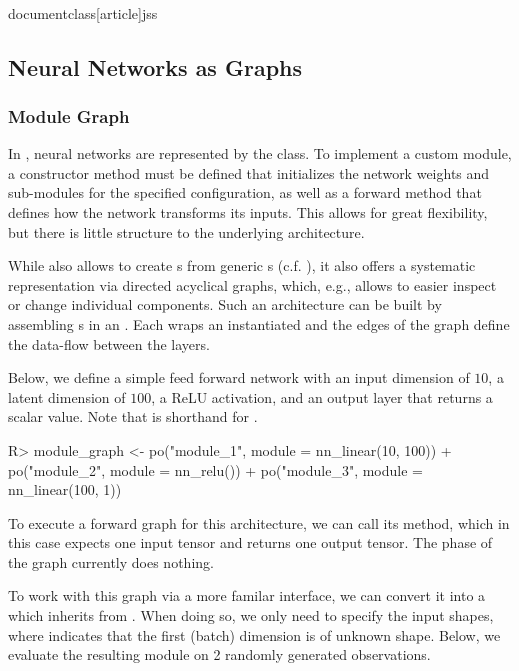 \\documentclass[article]{jss}
\theoremstyle{definition}
\begin{document}
\subsection{Neural Networks as Graphs}

\subsubsection{Module Graph}

In , neural networks are represented by the  class.
To implement a custom module, a constructor method must be defined that initializes the network weights and sub-modules for the specified configuration, as well as a forward method that defines how the network transforms its inputs.
This allows for great flexibility, but there is little structure to the underlying architecture.

While  also allows to create s from generic s (c.f. ), it also offers a systematic representation via directed acyclical graphs, which, e.g., allows to easier inspect or change individual components.
Such an architecture can be built by assembling s in an .
Each  wraps an instantiated  and the edges of the graph define the data-flow between the layers.

Below, we define a simple feed forward network with an input dimension of $10$, a latent dimension of $100$, a ReLU activation, and an output layer that returns a scalar value.
Note that  is shorthand for .

\begin{CodeInput}
R> module_graph <- po("module_1", module = nn_linear(10, 100)) %
+   po("module_2", module = nn_relu()) %
+   po("module_3", module = nn_linear(100, 1))
\end{CodeInput}

To execute a forward graph for this architecture, we can call its  method, which in this case expects one input tensor and returns one output tensor.
The  phase of the graph currently does nothing.

To work with this graph via a more familar interface, we can convert it into a  which inherits from .
When doing so, we only need to specify the input shapes, where  indicates that the first (batch) dimension is of unknown shape.
Below, we evaluate the resulting module on 2 randomly generated observations.
\end{document}
